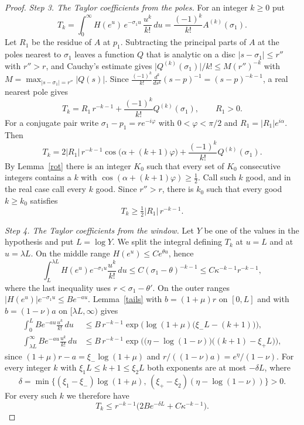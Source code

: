 \begin{proof}
\emph{Step 3. The Taylor coefficients from the poles.} For an integer $k\ge0$ put
\[
T_k=\int_0^\infty H(e^u)\,e^{-\sigma_1u}\,\frac{u^k}{k!}\,du=\frac{(-1)^k}{k!}A^{(k)}(\sigma_1).
\]
Let $R_1$ be the residue of $A$ at $p_1$. Subtracting the principal parts of $A$ at the poles nearest to $\sigma_1$ leaves a function $Q$ that is analytic on a disc $\lvert s-\sigma_1\rvert\le r''$ with $r''>r$, and Cauchy's estimate gives $\lvert Q^{(k)}(\sigma_1)\rvert/k!\le M(r'')^{-k}$ with $M=\max_{\lvert s-\sigma_1\rvert=r''}\lvert Q(s)\rvert$. Since $\frac{(-1)^k}{k!}\frac{d^k}{ds^k}(s-p)^{-1}=(s-p)^{-k-1}$, a real nearest pole gives
\[
T_k=R_1\,r^{-k-1}+\frac{(-1)^k}{k!}Q^{(k)}(\sigma_1),\qquad R_1>0 .
\]
For a conjugate pair write $\sigma_1-p_1=re^{-i\varphi}$ with $0<\varphi<\pi/2$ and $R_1=\lvert R_1\rvert e^{i\alpha}$. Then
\[
T_k=2\lvert R_1\rvert\,r^{-k-1}\cos\big(\alpha+(k+1)\varphi\big)+\frac{(-1)^k}{k!}Q^{(k)}(\sigma_1).
\]
By Lemma~\ref{rot} there is an integer $K_0$ such that every set of $K_0$ consecutive integers contains a $k$ with $\cos(\alpha+(k+1)\varphi)\ge\frac12$. Call such $k$ good, and in the real case call every $k$ good. Since $r''>r$, there is $k_0$ such that every good $k\ge k_0$ satisfies
\begin{equation}\label{lower}
T_k\ge\tfrac12\lvert R_1\rvert\,r^{-k-1}.
\end{equation}

\emph{Step 4. The Taylor coefficients from the window.} Let $Y$ be one of the values in the hypothesis and put $L=\log Y$. We split the integral defining $T_k$ at $u=L$ and at $u=\lambda L$. On the middle range $H(e^u)\le Ce^{\theta u}$, hence
\[
\int_L^{\lambda L}H(e^u)e^{-\sigma_1u}\frac{u^k}{k!}\,du\le C(\sigma_1-\theta)^{-k-1}\le C\kappa^{-k-1}r^{-k-1},
\]
where the last inequality uses $r<\sigma_1-\theta'$. On the outer ranges $\lvert H(e^u)\rvert e^{-\sigma_1u}\le Be^{-au}$. Lemma~\ref{tails} with $b=(1+\mu)r$ on $[0,L]$ and with $b=(1-\nu)a$ on $[\lambda L,\infty)$ gives
\begin{align*}
\int_0^L Be^{-au}\frac{u^k}{k!}\,du&\le B\,r^{-k-1}\exp\Big(\log(1+\mu)\big(\xi_-L-(k+1)\big)\Big),\\
\int_{\lambda L}^\infty Be^{-au}\frac{u^k}{k!}\,du&\le B\,r^{-k-1}\exp\Big(\big(\eta-\log(1-\nu)\big)\big((k+1)-\xi_+L\big)\Big),
\end{align*}
since $(1+\mu)r-a=\xi_-\log(1+\mu)$ and $r/((1-\nu)a)=e^{\eta}/(1-\nu)$. For every integer $k$ with $\xi_1L\le k+1\le\xi_2L$ both exponents are at most $-\delta L$, where
\[
\delta=\min\big\{(\xi_1-\xi_-)\log(1+\mu),\,(\xi_+-\xi_2)(\eta-\log(1-\nu))\big\}>0 .
\]
For every such $k$ we therefore have
\begin{equation}\label{upper}
T_k\le r^{-k-1}\big(2Be^{-\delta L}+C\kappa^{-k-1}\big).
\end{equation}


\end{proof}
